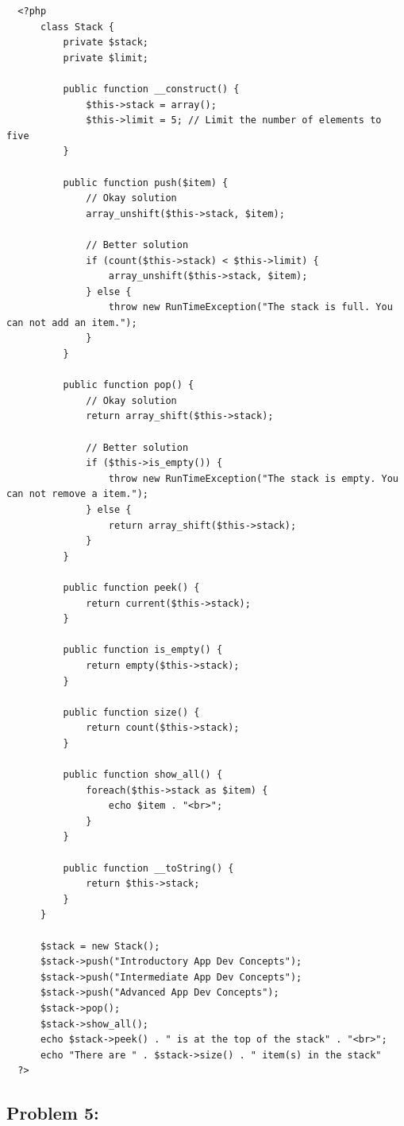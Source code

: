 \documentclass{article}
\begin{document}
\begin{verbatim}
  <?php
      class Stack {
          private $stack;
          private $limit;

          public function __construct() {
              $this->stack = array();
              $this->limit = 5; // Limit the number of elements to five
          }

          public function push($item) {
              // Okay solution
              array_unshift($this->stack, $item); 

              // Better solution
              if (count($this->stack) < $this->limit) {
                  array_unshift($this->stack, $item);
              } else {
                  throw new RunTimeException("The stack is full. You can not add an item.");
              }
          }

          public function pop() {
              // Okay solution
              return array_shift($this->stack);

              // Better solution
              if ($this->is_empty()) {
                  throw new RunTimeException("The stack is empty. You can not remove a item.");
              } else {
                  return array_shift($this->stack); 
              }
          }

          public function peek() {
              return current($this->stack);
          }

          public function is_empty() {
              return empty($this->stack);
          }

          public function size() {
              return count($this->stack);
          }

          public function show_all() {
              foreach($this->stack as $item) {
                  echo $item . "<br>";
              }
          }

          public function __toString() {
              return $this->stack;
          }
      }   
          
      $stack = new Stack();
      $stack->push("Introductory App Dev Concepts");
      $stack->push("Intermediate App Dev Concepts");
      $stack->push("Advanced App Dev Concepts");
      $stack->pop();
      $stack->show_all();
      echo $stack->peek() . " is at the top of the stack" . "<br>";
      echo "There are " . $stack->size() . " item(s) in the stack"
  ?>
\end{verbatim}

\subsection*{Problem 5:} 
\end{document}

